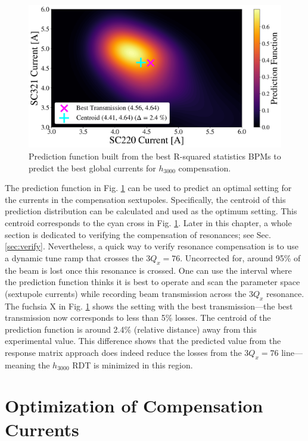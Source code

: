 \begin{figure}[H]
    \centering
    \includegraphics[width=\columnwidth]{chapter4/comp_interval.png}
    \caption{Prediction function built from the best R-squared statistics BPMs to predict the best global currents for $h_{3000}$ compensation.}
    \label{fig:icomp_int}
\end{figure}

The prediction function in Fig. \ref{fig:icomp_int} can be used to predict an optimal setting for the currents in the compensation sextupoles. Specifically, the centroid of this prediction distribution can be calculated and used as the optimum setting. This centroid corresponds to the cyan cross in Fig. \ref{fig:icomp_int}. Later in this chapter, a whole section is dedicated to verifying the compensation of resonances; see Sec. \ref{sec:verify}. Nevertheless, a quick way to verify resonance compensation is to use a dynamic tune ramp that crosses the $3Q_x=76$. Uncorrected for, around 95\% of the beam is lost once this resonance is crossed. One can use the interval where the prediction function thinks it is best to operate and scan the parameter space (sextupole currents) while recording beam transmission across the $3Q_x$ resonance. The fuchsia X in Fig. \ref{fig:icomp_int} shows the setting with the best transmission---the best transmission now corresponds to less than 5\% losses. The centroid of the prediction function is around 2.4\% (relative distance) away from this experimental value. This difference shows that the predicted value from the response matrix approach does indeed reduce the losses from the $3Q_x=76$ line---meaning the $h_{3000}$ RDT is minimized in this region.

\section{\label{sec:optimize}Optimization of Compensation Currents}

